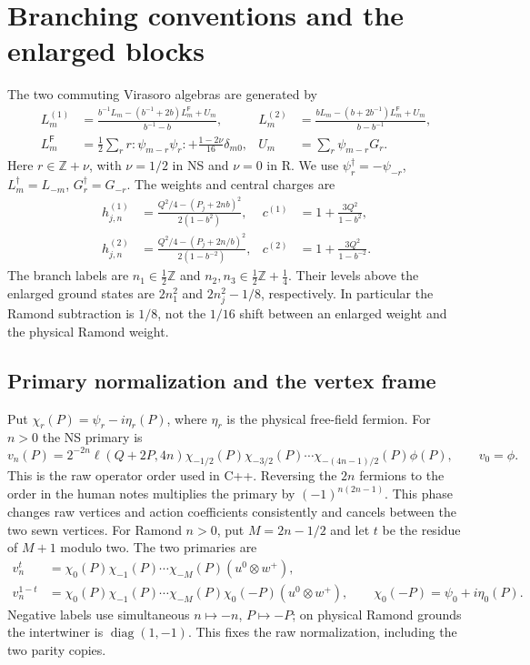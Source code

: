 \documentclass[11pt]{article}
\numberwithin{equation}{section}
\begin{document}
\section{Branching conventions and the enlarged blocks}
\label{sec:branch-sums}

The two commuting Virasoro algebras are generated by
\begin{align}
 L_m^{(1)}&=\frac{b^{-1}L_m-(b^{-1}+2b)L_m^{\mathsf F}+U_m}{b^{-1}-b},&
 L_m^{(2)}&=\frac{bL_m-(b+2b^{-1})L_m^{\mathsf F}+U_m}{b-b^{-1}},\\
 L_m^{\mathsf F}&=\frac12\sum_r r:\psi_{m-r}\psi_r:
                  +\frac{1-2\nu}{16}\delta_{m0},&
 U_m&=\sum_r\psi_{m-r}G_r.
\end{align}
Here $r\in\mathbb Z+\nu$, with $\nu=1/2$ in NS and $\nu=0$ in R.
We use $\psi_r^\dagger=-\psi_{-r}$, $L_m^\dagger=L_{-m}$,
$G_r^\dagger=G_{-r}$. The weights and central charges are
\begin{align}
 h_{j,n}^{(1)}&=\frac{Q^2/4-(P_j+2nb)^2}{2(1-b^2)},&
 c^{(1)}&=1+\frac{3Q^2}{1-b^2},\\
 h_{j,n}^{(2)}&=\frac{Q^2/4-(P_j+2n/b)^2}{2(1-b^{-2})},&
 c^{(2)}&=1+\frac{3Q^2}{1-b^{-2}}.
 \label{eq:weights}
\end{align}
The branch labels are $n_1\in\tfrac12\mathbb Z$ and
$n_2,n_3\in\tfrac12\mathbb Z+\tfrac14$. Their levels above the
enlarged ground states are $2n_1^2$ and $2n_j^2-1/8$, respectively.
In particular the Ramond subtraction is $1/8$, not the $1/16$ shift
between an enlarged weight and the physical Ramond weight.

\subsection{Primary normalization and the vertex frame}
Put $\chi_r(P)=\psi_r-i\eta_r(P)$, where $\eta_r$ is the physical
free-field fermion. For $n>0$ the NS primary is
\begin{equation}
 v_n(P)=2^{-2n}\ell(Q+2P,4n)
 \chi_{-1/2}(P)\chi_{-3/2}(P)\cdots\chi_{-(4n-1)/2}(P)\phi(P),
 \qquad v_0=\phi.
\end{equation}
This is the raw operator order used in C++. Reversing the $2n$ fermions
to the order in the human notes multiplies the primary by
$(-1)^{n(2n-1)}$. This phase changes raw vertices and action coefficients
consistently and cancels between the two sewn vertices.
For Ramond $n>0$, put $M=2n-1/2$ and let $t$ be the residue of $M+1$
modulo two. The two primaries are
\begin{align}
 v_n^t&=\chi_0(P)\chi_{-1}(P)\cdots\chi_{-M}(P)(u^0\otimes w^+),\\
 v_n^{1-t}&=\chi_0(P)\chi_{-1}(P)\cdots\chi_{-M}(P)
                 \chi_0(-P)(u^0\otimes w^+),
 \qquad \chi_0(-P)=\psi_0+i\eta_0(P).
\end{align}
Negative labels use simultaneous $n\mapsto-n$, $P\mapsto-P$;
on physical Ramond grounds the intertwiner is $\operatorname{diag}(1,-1)$.
This fixes the raw normalization, including the two parity copies.
\end{document}
